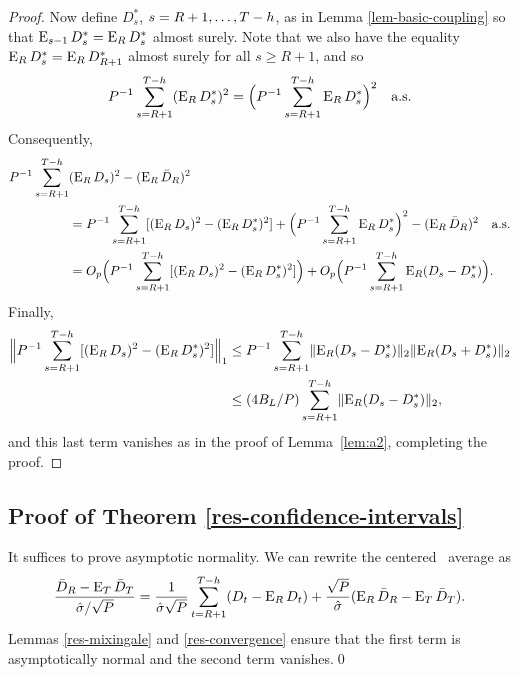 \documentclass[11pt]{article}
\begin{document}
\begin{proof}
Now define $D_s^*$, $s = R+1,\dots,T-h$, as in Lemma
\ref{lem-basic-coupling} so that $\operatorname{E}_{s-1} D_s^* = \operatorname{E}_R D_s^*$ almost
surely.  Note that we also have the equality $\operatorname{E}_R D_s^* = \operatorname{E}_R
D_{R+1}^*$ almost surely for all $s\geq R+1$, and so
\[
P^{-1} \sum_{s=R+1}^{T-h} (\operatorname{E}_R D_s^*)^2 = \Big(P^{-1} \sum_{s=R+1}^{T-h} \operatorname{E}_R
D_s^*\Big)^2 \quad \text{a.s.}
\]
Consequently,
\begin{align*}
P^{-1} \sum_{s=R+1}^{T-h}& (\operatorname{E}_R D_s)^2 - (\operatorname{E}_R\bar{D}_{R})^2 \\
&= P^{-1} \sum_{s=R+1}^{T-h} [(\operatorname{E}_R D_s)^2 - (\operatorname{E}_R D_s^*)^2]
 + \Big(P^{-1} \sum_{s=R+1}^{T-h} \operatorname{E}_R D_s^*\Big)^2 - (\operatorname{E}_R\bar{D}_{R})^2 \quad \text{a.s}.\\
&= O_p\Big(P^{-1} \sum_{s=R+1}^{T-h} [(\operatorname{E}_R D_s)^2 - (\operatorname{E}_R D_s^*)^2]\Big)
 + O_p\Big(P^{-1} \sum_{s=R+1}^{T-h} \operatorname{E}_R (D_s - D_s^*)\Big).
\end{align*}
Finally,
\begin{align*}
\Big\lVert P^{-1} \sum_{s=R+1}^{T-h} [(\operatorname{E}_RD_s)^2 - (\operatorname{E}_R D_s^*)^2] \Big\rVert_1
&\leq P^{-1} \sum_{s=R+1}^{T-h} \lVert \operatorname{E}_R (D_s - D_s^*) \rVert_2 \lVert
\operatorname{E}_R (D_s + D_s^*) \rVert_2
\\ &\leq (4 B_L/P) \sum_{s=R+1}^{T-h} \lVert \operatorname{E}_R (D_s - D_s^*) \rVert_2,
\end{align*}
and this last term vanishes as in the proof of Lemma~\ref{lem:a2},
completing the proof.
\end{proof}

\subsection*{Proof of Theorem \ref{res-confidence-intervals}}

It suffices to prove asymptotic normality.  We can rewrite the
centered \oos\ average as
\[
\frac{\bar{D}_{R} - \operatorname{E}_T \bar{D}_T}{\hat{\sigma} / \sqrt{P}} =
\frac{1}{\hat{\sigma} \sqrt{P}}\sum_{t=R+1}^{T-h} (D_t - \operatorname{E}_R D_t) +
\frac{\sqrt{P}}{\hat{\sigma}} (\operatorname{E}_R\bar{D}_{R} - \operatorname{E}_T\bar{D}_{T}).
\]
Lemmas \ref{res-mixingale} and
\ref{res-convergence} ensure that the first term is asymptotically
normal and the second term vanishes.\qed
\end{document}
